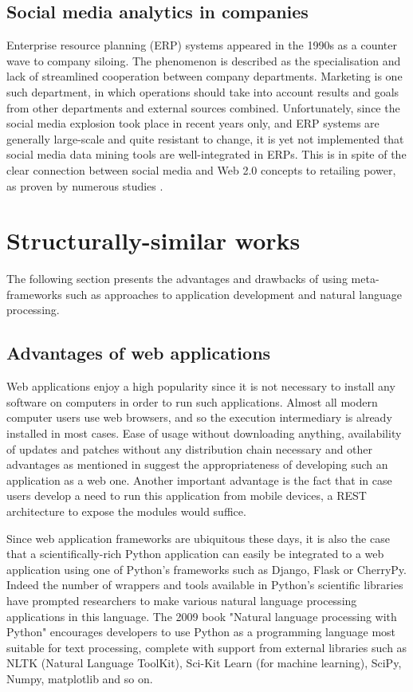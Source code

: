 \documentclass[12pt,a4paper,twoside]{report}
\begin{document}
\subsection{Social media analytics in companies}
Enterprise resource planning (ERP) systems appeared in the 1990s as a counter wave to company siloing. The phenomenon is described as the specialisation and lack of streamlined cooperation between company departments. Marketing is one such department, in which operations should take into account results and goals from other departments and external sources combined. Unfortunately, since the social media explosion took place in recent years only, and ERP systems are generally large-scale and quite resistant to change, it is yet not implemented that social media data mining tools are well-integrated in ERPs. This is in spite of the clear connection between social media and Web 2.0 concepts to retailing power, as proven by numerous studies \cite{constantinides2008social}.

\section{Structurally-similar works}
The following section presents the advantages and drawbacks of using meta-frameworks such as approaches to application development and natural language processing.

\subsection{Advantages of web applications}
Web applications enjoy a high popularity since it is not necessary to install any software on computers in order to run such applications. Almost all modern computer users use web browsers, and so the execution intermediary is already installed in most cases. Ease of usage without downloading anything, availability of updates and patches without any distribution chain necessary and other advantages as mentioned in \cite{tung2013internet} suggest the appropriateness of developing such an application as a web one. Another important advantage is the fact that in case users develop a need to run this application from mobile devices, a REST architecture to expose the modules would suffice.

Since web application frameworks are ubiquitous these days, it is also the case that a scientifically-rich Python application can easily be integrated to a web application using one of Python's frameworks such as Django, Flask or CherryPy. Indeed the number of wrappers and tools available in Python's scientific libraries have prompted researchers to make various natural language processing applications in this language. The 2009 book "Natural language processing with Python" \cite{bird2009natural} encourages developers to use Python as a programming language most suitable for text processing, complete with support from external libraries such as NLTK (Natural Language ToolKit), Sci-Kit Learn (for machine learning), SciPy, Numpy, matplotlib and so on.
\end{document}
